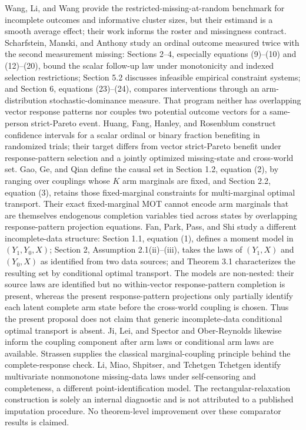 \documentclass{article}
\begin{document}
Wang, Li, and Wang provide the restricted-missing-at-random benchmark for incomplete outcomes and informative cluster sizes, but their estimand is a smooth average effect; their work informs the roster and missingness contract. Scharfstein, Manski, and Anthony study an ordinal outcome measured twice with the second measurement missing: Sections 2--4, especially equations (9)--(10) and (12)--(20), bound the scalar follow-up law under monotonicity and indexed selection restrictions; Section 5.2 discusses infeasible empirical constraint systems; and Section 6, equations (23)--(24), compares interventions through an arm-distribution stochastic-dominance measure. That program neither has overlapping vector response patterns nor couples two potential outcome vectors for a same-person strict-Pareto event. Huang, Fang, Hanley, and Rosenblum construct confidence intervals for a scalar ordinal or binary fraction benefiting in randomized trials; their target differs from vector strict-Pareto benefit under response-pattern selection and a jointly optimized missing-state and cross-world set. Gao, Ge, and Qian define the causal set in Section 1.2, equation (2), by ranging over couplings whose \(K\) arm marginals are fixed, and Section 2.2, equation (3), retains those fixed-marginal constraints for multi-marginal optimal transport. Their exact fixed-marginal MOT cannot encode arm marginals that are themselves endogenous completion variables tied across states by overlapping response-pattern projection equations. Fan, Park, Pass, and Shi study a different incomplete-data structure: Section 1.1, equation (1), defines a moment model in \((Y_1,Y_0,X)\); Section 2, Assumption 2.1(ii)--(iii), takes the laws of \((Y_1,X)\) and \((Y_0,X)\) as identified from two data sources; and Theorem 3.1 characterizes the resulting set by conditional optimal transport. The models are non-nested: their source laws are identified but no within-vector response-pattern completion is present, whereas the present response-pattern projections only partially identify each latent complete arm state before the cross-world coupling is chosen. Thus the present proposal does not claim that generic incomplete-data conditional optimal transport is absent. Ji, Lei, and Spector and Ober-Reynolds likewise inform the coupling component after arm laws or conditional arm laws are available. Strassen supplies the classical marginal-coupling principle behind the complete-response check. Li, Miao, Shpitser, and Tchetgen Tchetgen identify multivariate nonmonotone missing-data laws under self-censoring and completeness, a different point-identification model. The rectangular-relaxation construction is solely an internal diagnostic and is not attributed to a published imputation procedure. No theorem-level improvement over these comparator results is claimed.
\end{document}
